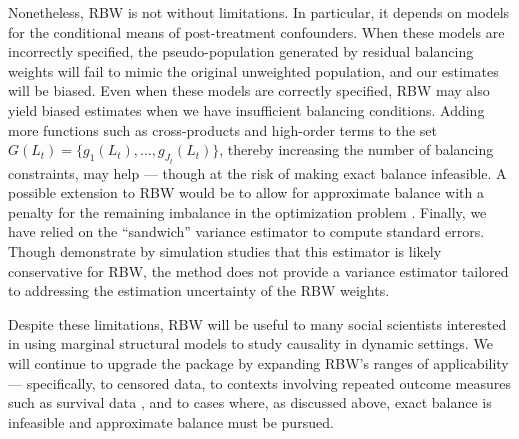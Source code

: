 Nonetheless, RBW is not without limitations. In particular, it depends
on models for the conditional means of post-treatment confounders. When
these models are incorrectly specified, the pseudo-population generated
by residual balancing weights will fail to mimic the original unweighted
population, and our estimates will be biased. Even when these models are
correctly specified, RBW may also yield biased estimates when we have
insufficient balancing conditions. Adding more functions such as
cross-products and high-order terms to the set
\(G(L_{t})=\{g_{1}(L_{t}),...,g_{J_{t}}(L_{t})\}\), thereby increasing
the number of balancing constraints, may help --- though at the risk of
making exact balance infeasible. A possible extension to RBW would be to
allow for approximate balance with a penalty for the remaining imbalance
in the optimization problem
\citep{fongCovariateBalancingPropensity2018}. Finally, we have relied on
the ``sandwich'' variance estimator to compute standard errors. Though
\citet{zhouResidualBalancingMethod2020a} demonstrate by simulation
studies that this estimator is likely conservative for RBW, the method
does not provide a variance estimator tailored to addressing the
estimation uncertainty of the RBW weights.

Despite these limitations, RBW will be useful to many social scientists
interested in using marginal structural models to study causality in
dynamic settings. We will continue to upgrade the package by expanding
RBW's ranges of applicability --- specifically, to censored data, to
contexts involving repeated outcome measures such as survival data
\citep{hernanEstimatingCausalEffect2002, hernanMarginalStructuralModels2000},
and to cases where, as discussed above, exact balance is infeasible and
approximate balance must be pursued.



\address{%
Derick Baum\\
Harvard University\\%
Department of Sociology\\
%
%
%
\href{mailto:derick_baum@g.harvard.edu}{\nolinkurl{derick\_baum@g.harvard.edu}}%
}

\address{%
Xiang Zhou\\
Harvard University\\%
Department of Sociology\\
%
%
%
\href{mailto:xiang_zhou@fas.harvard.edu}{\nolinkurl{xiang\_zhou@fas.harvard.edu}}%
}

